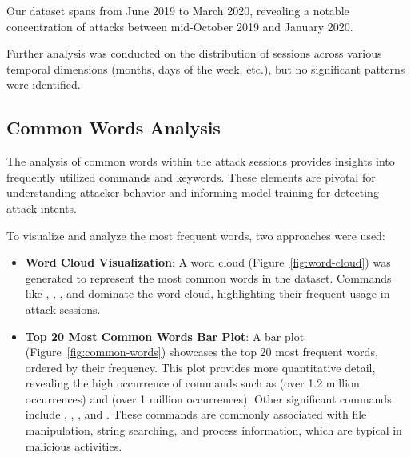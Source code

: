        
        Our dataset spans from June 2019 to March 2020, revealing a notable concentration of attacks between mid-October 2019 and January 2020.

        Further analysis was conducted on the distribution of sessions across various temporal dimensions (months, days of the week, etc.), but no significant patterns were identified.
        

    \subsection{Common Words Analysis}
    
        The analysis of common words within the attack sessions provides insights into frequently utilized commands and keywords. These elements are pivotal for understanding attacker behavior and informing model training for detecting attack intents. 

        To visualize and analyze the most frequent words, two approaches were used: 
        
        \vspace{0.2em}

        \begin{itemize}
        
            \item \textbf{Word Cloud Visualization}: A word cloud (Figure~\ref{fig:word-cloud}) was generated to represent the most common words in the dataset. Commands like , , , and  dominate the word cloud, highlighting their frequent usage in attack sessions.
            
            \vspace{0.2em}

            \item \textbf{Top 20 Most Common Words Bar Plot}: A bar plot (Figure~\ref{fig:common-words}) showcases the top 20 most frequent words, ordered by their frequency. This plot provides more quantitative detail, revealing the high occurrence of commands such as  (over 1.2 million occurrences) and  (over 1 million occurrences). Other significant commands include , , , and . These commands are commonly associated with file manipulation, string searching, and process information, which are typical in malicious activities.
            
        \end{itemize}
        
